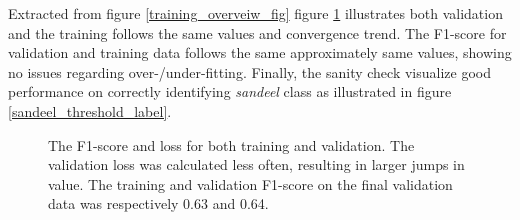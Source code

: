         
        Extracted from figure \ref{training_overveiw_fig} figure \ref{loss_f1_duo_plot_fig} illustrates both validation and the training follows the same values and convergence trend. The F1-score for validation and training data follows the same approximately same values, showing no issues regarding over-/under-fitting. Finally, the sanity check visualize good performance on correctly identifying \textit{sandeel} class as illustrated in figure \ref{sandeel_threshold_label}.%
        
        \clearpage
        \begin{figure}[H]
            \centering
            \qquad
            \caption[Loss and F1 score during training]{The F1-score and loss for both training and validation. The validation loss was calculated less often, resulting in larger jumps in value. The training and validation F1-score on the final validation data was respectively 0.63 and 0.64.}%
            \label{loss_f1_duo_plot_fig}%
        \end{figure}
            
